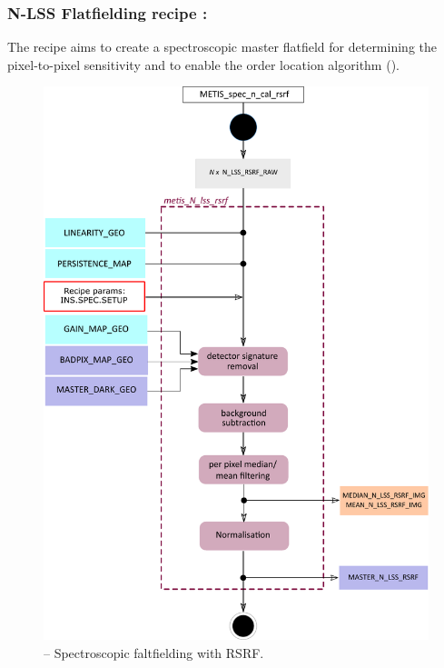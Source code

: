 \subsubsection{N-LSS Flatfielding recipe :}\label{rec:metis_n_lss_rsrf}
The recipe \hyperref[rec:metis_n_lss_rsrf]{} aims to create a spectroscopic master flatfield for determining the pixel-to-pixel sensitivity and to enable the order location algorithm ().
\begin{figure}[ht]
  \centering
  \includegraphics[width=0.5\textheight]{figures/metis_n_lss_rsrf_v0.83.pdf}
  \caption[Recipe: ]{ --
    Spectroscopic faltfielding with \ac{RSRF}.}
  \label{Fig:rec_n_lss_rsrf}
\end{figure}

